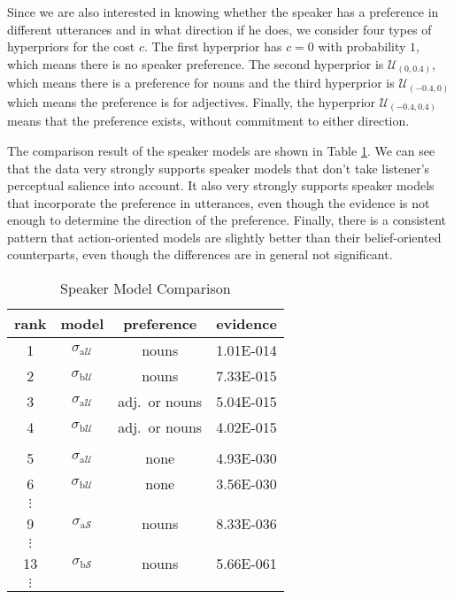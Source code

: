 Since we are also interested in knowing whether the speaker has a preference in different utterances and in what direction if he does, we consider four types of hyperpriors for the cost $c$. The first hyperprior has $c=0$ with probability $1$, which means there is no speaker preference. The second hyperprior is $\mathcal{U}_{(0,0.4)}$, which means there is a preference for nouns and the third hyperprior is $\mathcal{U}_{(-0.4,0)}$ which means the preference is for adjectives. Finally, the hyperprior $\mathcal{U}_{(-0.4,0.4)}$ means that the preference exists, without commitment to either direction.

The comparison result of the speaker models are shown in Table \ref{table:speaker mod}. We can see that the data very strongly supports speaker models that don't take listener's perceptual salience into account. It also very strongly supports speaker models that incorporate the preference in utterances, even though the evidence is not enough to determine the direction of the preference. Finally, there is a consistent pattern that action-oriented models are slightly better than their belief-oriented counterparts, even though the differences are in general not significant.  

\begin{table}[htb] 
\caption{Speaker Model Comparison}
  \centering 
  \begin{tabular}{cccc}
    rank & model & preference & evidence \\
    \hline 
    1 
    & $\sigma_{\mathrm{a}\mathcal{U}}$ 
    & nouns
    & 1.01E-014
    \\
    2 
    & $\sigma_{\mathrm{b}\mathcal{U}}$ 
    & nouns
    & 7.33E-015
    \\
    3 
    & $\sigma_{\mathrm{a}\mathcal{U}}$ 
    & adj.~or nouns \quad
    &  5.04E-015
    \\
    4 
    & $\sigma_{\mathrm{b}\mathcal{U}}$ 
    &  adj.~or nouns
    & 4.02E-015
    \\     \\
    5 
    & $\sigma_{\mathrm{a}\mathcal{U}}$ 
    &  none
    & 4.93E-030
    \\
    6 
    & $\sigma_{\mathrm{b}\mathcal{U}}$ 
    &  none
    & 3.56E-030
    \\
    $\vdots$
    \\
    9 
    & $\sigma_{\mathrm{a}\mathcal{S}}$ 
    & nouns
    & 8.33E-036
    \\
    $\vdots$
    \\
    13 
    & $\sigma_{\mathrm{b}\mathcal{S}}$ 
    & nouns
    & 5.66E-061
    \\
    $\vdots$
  \end{tabular}
 
  \label{table:speaker mod}
\end{table}

